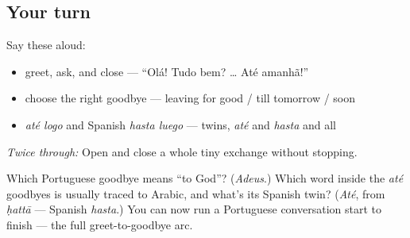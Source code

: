 \subsection*{Your turn}
Say these aloud:

\begin{itemize}
\raggedright
  \item greet, ask, and close — \textquotedblleft{}Olá! Tudo bem? … Até amanhã!\textquotedblright{}
  \item choose the right goodbye — leaving for good / till tomorrow / soon
  \item \emph{até logo} and Spanish \emph{hasta luego} — twins, \emph{até} and \emph{hasta} and all
\end{itemize}

\emph{Twice through:} Open and close a whole tiny exchange without stopping.

\begin{tcolorbox}[breakable,colback=teal!4,colframe=teal!35!black,title={Before you move on}]
Which Portuguese goodbye means \textquotedblleft{}to God\textquotedblright{}? (\emph{Adeus}.) Which word inside the \emph{até} goodbyes is usually traced to Arabic, and what's its Spanish twin? (\emph{Até}, from \emph{ḥattā} — Spanish \emph{hasta}.) You can now run a Portuguese conversation start to finish — the full greet-to-goodbye arc.
\end{tcolorbox}
